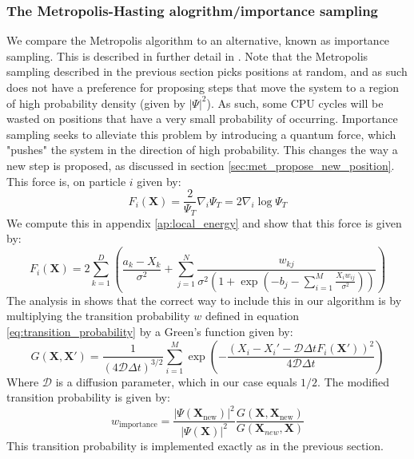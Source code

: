 \documentclass[a4paper, 10pt]{article}
\begin{document}
	\subsubsection{The Metropolis-Hasting alogrithm/importance sampling}
	We compare the Metropolis algorithm to an alternative, known as importance sampling. This is described in further detail in \cite{Hjorth-Jensen2015}. Note that the Metropolis sampling described in the previous section picks positions at random, and as such does not have a preference for proposing steps that move the system to a region of high probability density (given by $|\Psi|^2$). As such, some CPU cycles will be wasted on positions that have a very small probability of occurring. Importance sampling seeks to alleviate this problem by introducing a quantum force, which "pushes" the system in the direction of high probability. This changes the way a new step is proposed, as discussed in section \ref{sec:met_propose_new_position}. This force is, on particle $i$ given by:
	\begin{equation}
	F_i(\boldsymbol{X})=\frac{2}{\Psi_T}\nabla_i \Psi_T=2\nabla_i \log \Psi_T
	\end{equation}
	We compute this in appendix \ref{ap:local_energy} and show that this force is given by:
	\begin{equation}\label{eq:quantum_force}
	F_i(\boldsymbol{X})=2\sum_{k=1}^D \left(\frac{a_k-X_k}{\sigma^2}+\sum_{j=1}^N \frac{w_{kj}}{\sigma^2 \left(1+ \exp \left(-b_j-\sum_{i=1}^{M} \frac{X_iw_{ij}}{\sigma^2}\right)\right)}\right)
	\end{equation}
	The analysis in \cite{Hjorth-Jensen2015} shows that the correct way to include this in our algorithm is by multiplying the transition probability $w$ defined in equation \ref{eq:transition_probability} by a Green's function given by:
	\begin{equation}
	G(\mathbf{X}, \mathbf{X}')=\frac{1}{(4\mathcal{D}\Delta t)^{3/2}}\sum_{i=1}^M \exp \left(-\frac{(X_i-X_i'-\mathcal{D}\Delta t F_i(\mathbf{X}'))^2}{4\mathcal{D}\Delta t}\right)
	\end{equation}
	Where $\mathcal{D}$ is a diffusion parameter, which in our case equals $1/2$. The modified transition probability is given by:
	\begin{equation}
	w_{\mathrm{importance}}=\frac{|\Psi(\boldsymbol{X}_{\mathrm{new}})|^2}{|\Psi(\boldsymbol{X})|^2}\frac{G(\boldsymbol{X}, \boldsymbol{X}_{\mathrm{new}})}{G(\boldsymbol{X}_{new}, \boldsymbol{X})}
	\end{equation}
	This transition probability is implemented exactly as in the previous section. 
\end{document}
